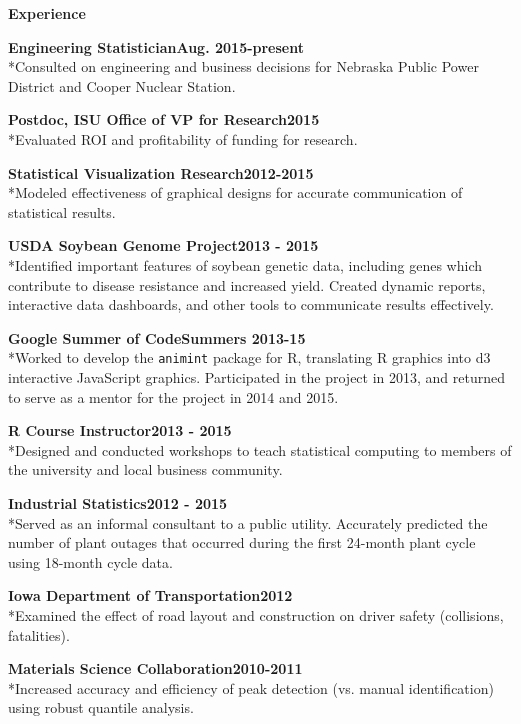 \documentclass[letterpaper,12pt,final]{memoir}
\newcommand{\MedSep}{\vspace{1em}}
\newcommand{\SmallSep}{\vspace{0.5em}}
\newcommand{\CVSection}[1]
	{\Large\textbf{#1}\par
	\SmallSep\normalsize\normalfont}
\newcommand{\CVItem}[1]
	{\textbf{\color{RoyalBlue} #1}}
\newcommand{\Experience}[3]{\parbox{\linewidth}{\CVItem{#1\hfill#2}\\*{\small #3\MedSep}}}
\begin{document}
\CVSection{Experience}
\begin{multicols}{2}
\Experience{Engineering Statistician}
{Aug. 2015-present}
{Consulted on engineering and business decisions for Nebraska Public Power District and Cooper Nuclear Station.}

\Experience{Postdoc, ISU Office of VP for Research}
{2015}
{Evaluated ROI and profitability of funding for research.}

\Experience{Statistical Visualization Research}
{2012-2015}
{Modeled effectiveness of graphical designs for accurate communication of statistical results.}

\Experience{USDA Soybean Genome Project}
{2013 - 2015}
{Identified important features of soybean genetic data, including genes which contribute to disease resistance and increased yield. Created dynamic reports, interactive data dashboards, and other tools to communicate results effectively.}

\Experience{Google Summer of Code}
{Summers 2013-15}
{Worked to develop the \texttt{animint} package for R, translating R graphics into d3 interactive JavaScript graphics. Participated in the project in 2013, and returned to serve as a mentor for the project in 2014 and 2015.}

\Experience{R Course Instructor}
{2013 - 2015}
{Designed and conducted workshops to teach statistical computing to members of the university and local business community.}


\Experience{Industrial Statistics}
{2012 - 2015}
{Served as an informal consultant to a public utility. Accurately predicted the number of plant outages that occurred during the first 24-month plant cycle using 18-month cycle data. }

\Experience{Iowa Department of Transportation}
{2012}
{Examined the effect of road layout and construction on driver safety (collisions, fatalities).}

\Experience{Materials Science Collaboration}
{2010-2011}
{Increased accuracy and efficiency of peak detection (vs. manual identification) using robust quantile analysis. }
\end{multicols}
\end{document}
